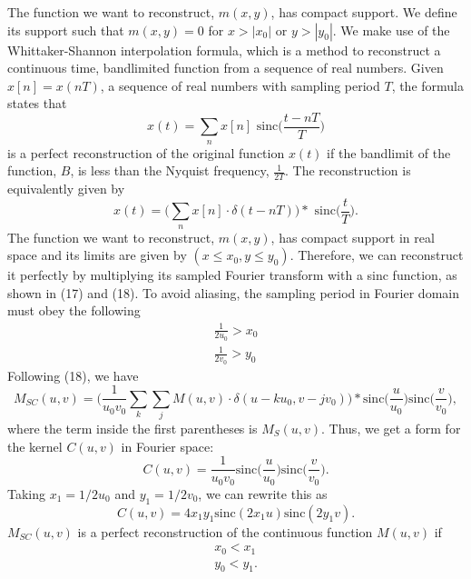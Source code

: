 \documentclass[11pt]{article}
\begin{document}
The function we want to reconstruct, $m(x,y)$, has compact support. We define its support such that $m(x,y) = 0$ for $x>|x_0|$ or $y>|y_0|$. We make use of the Whittaker-Shannon interpolation formula, which is a method to reconstruct a continuous time, bandlimited function from a sequence of real numbers. Given $x[n] = x(nT)$, a sequence of real numbers with sampling period $T$, the formula states that 
\begin{equation}
x(t) = \sum_n x[n] \text{ sinc}\Bigg( \frac{t-nT}{T}\Bigg)
\end{equation}
is a perfect reconstruction of the original function $x(t)$ if the bandlimit of the function, $B$, is less than the Nyquist frequency, $\frac{1}{2T}$. The reconstruction is equivalently given by 
\begin{equation}
x(t) = \Bigg(\sum_n x[n] \cdot \delta(t-nT)\Bigg) \ast \text{ sinc}\Bigg( \frac{t}{T}\Bigg).
\end{equation}
The function we want to reconstruct, $m(x,y)$, has compact support in real space and its limits are given by $(x \leq x_0, y \leq y_0)$. Therefore, we can reconstruct it perfectly by multiplying its sampled Fourier transform with a sinc function, as shown in (17) and (18). To avoid aliasing, the sampling period in Fourier domain must obey the following
\begin{align}
\frac{1}{2u_0} > x_0 \\
\frac{1}{2v_0} > y_0
\end{align}
Following (18), we have
\begin{equation}
M_{SC}(u,v) =\Bigg( \frac{1}{u_0v_0} \sum_k \sum_j M(u,v) \cdot \delta(u-ku_0, v-jv_0)\Bigg) \ast \text{sinc}\Bigg(\frac{u}{u_0}\Bigg)\text{sinc}\Bigg(\frac{v}{v_0}\Bigg),
\end{equation}
where the term inside the first parentheses is $M_{S}(u,v)$. Thus, we get a form for the kernel $C(u,v)$ in Fourier space:
\begin{equation}
C(u,v) = \frac{1}{u_0v_0}\text{sinc}\Bigg(\frac{u}{u_0}\Bigg)\text{sinc}\Bigg(\frac{v}{v_0}\Bigg).
\end{equation}
Taking $x_1 = 1/2u_0$ and $y_1 = 1/2v_0$, we can rewrite this as
\begin{equation}
C(u,v) = 4x_1 y_1 \text{sinc}(2x_1 u) \text{sinc}(2y_1 v).
\end{equation}
$M_{SC}(u,v)$ is a perfect reconstruction of the continuous function $M(u,v)$ if
\begin{align}
x_0 < x_1 \\
y_0 < y_1.
\end{align}
\end{document}
